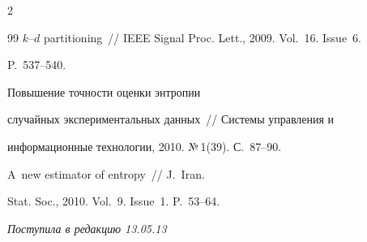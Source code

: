 \begin{multicols}{2}
{{\begin{thebibliography}{99}
  $k$--$d$ partitioning~// IEEE Signal Proc. Lett., 2009. Vol.~16. Issue~6. 

P.~537--540.


   Повышение точности оценки энтропии 

случайных экспериментальных данных~// Сис\-те\-мы управ\-ле\-ния и 

информационные технологии, 2010. №\,1(39). С.~87--90.


   A~new estimator of entropy~// J.~Iran. 

Stat. Soc., 2010. Vol.~9. Issue~1. P.~53--64.

  

 

  \end{thebibliography} } }

  







\end{multicols}



  \hfill{\small

\textit{Поступила в редакцию 13.05.13}}





















\newpage



\def\tit{STUDY OF THE DYNAMICS OF~MULTIDIMENSIONAL STOCHASTIC 

SYSTEMS BASED ON~ENTROPY MODELING}



\def\aut{A.\,N.~Tyrsin$^1$ and O.\,V.~Vorfolomeeva$^2$}



\def\autkol{A.\,N.~Tyrsin and O.\,V.~Vorfolomeeva}

